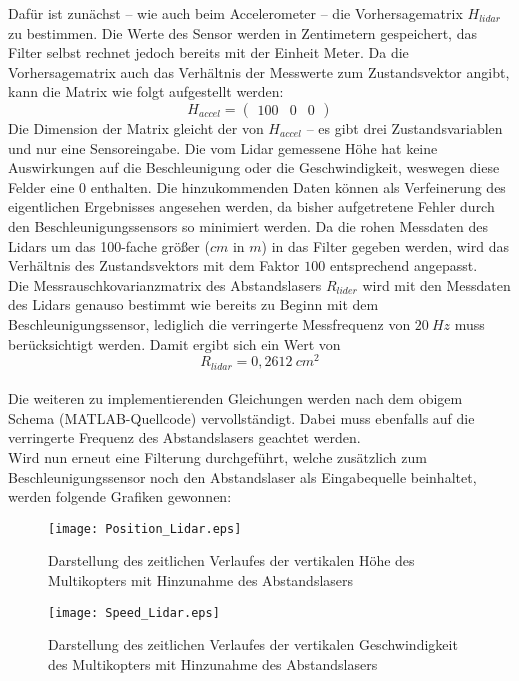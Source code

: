 \documentclass[12pt,a4paper]{article}
\begin{document}
\begin{enumerate}[label=\textbf{\arabic*})]
\begin{enumerate}[label=\textbf{\alph*})]
		Dafür ist zunächst -- wie auch beim Accelerometer -- die Vorhersagematrix $H_{lidar}$ zu bestimmen. Die Werte des Sensor werden in Zentimetern gespeichert, das Filter selbst rechnet jedoch bereits mit der Einheit Meter. Da die Vorhersagematrix auch das Verhältnis der Messwerte zum Zustandsvektor angibt, kann die Matrix wie folgt aufgestellt werden:
		\begin{equation}\label{eq:Vorhersagematrix_lidar}
			H_{accel}=
				\begin{pmatrix}
				100& 0 & 0
				\end{pmatrix}
		\end{equation}
		Die Dimension der Matrix gleicht der von $H_{accel}$ -- es gibt drei Zustandsvariablen und nur eine Sensoreingabe. Die vom Lidar gemessene Höhe hat keine Auswirkungen auf die Beschleunigung oder die Geschwindigkeit, weswegen diese Felder eine $0$ enthalten. Die hinzukommenden Daten können als Verfeinerung des eigentlichen Ergebnisses angesehen werden, da bisher aufgetretene Fehler durch den Beschleunigungssensors so minimiert werden. Da die rohen Messdaten des Lidars um das 100-fache größer ($cm$ in $m$) in das Filter gegeben werden, wird das Verhältnis des Zustandsvektors mit dem Faktor $100$ entsprechend angepasst.\\
		
		Die Messrauschkovarianzmatrix des Abstandslasers $R_{lider}$ wird mit den Messdaten des Lidars genauso bestimmt wie bereits zu Beginn mit dem Beschleunigungssensor, lediglich die verringerte Messfrequenz von $20~Hz$ muss berücksichtigt werden. Damit ergibt sich ein Wert von
		\begin{equation}\label{eq:Messrauschkovarianzmatrix_Lidar}
			R_{lidar}=0,2612~cm^{2}
		\end{equation}\\
		
		Die weiteren zu implementierenden Gleichungen werden nach dem obigem Schema (MATLAB-Quellcode) vervollständigt. Dabei muss ebenfalls auf die verringerte Frequenz des Abstandslasers geachtet werden.\\
		
		Wird nun erneut eine Filterung durchgeführt, welche zusätzlich zum Beschleunigungssensor noch den Abstandslaser als Eingabequelle beinhaltet, werden folgende Grafiken gewonnen:\\
		\begin{figure}[!ht]
			\centering
			\texttt{[image: Position\_Lidar.eps]}
			\caption{\label{fig:KalmanHoehe_Lidar}Darstellung des zeitlichen Verlaufes der vertikalen Höhe des Multikopters mit Hinzunahme des Abstandslasers}
		\end{figure}
		\begin{figure}[!ht]
			\centering
			\texttt{[image: Speed\_Lidar.eps]}
			\caption{\label{fig:KalmanGeschwindigkeit_Lidar}Darstellung des zeitlichen Verlaufes der vertikalen Geschwindigkeit des Multikopters mit Hinzunahme des Abstandslasers}
		\end{figure}
	

\end{enumerate}
\end{enumerate}
\end{document}
